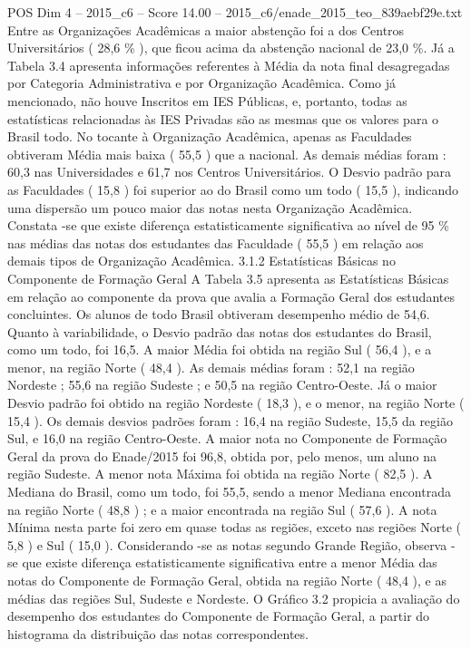 \begin{textsample}{POS Dim 4 – 2015\_c6 – Score 14.00 – 2015\_c6/enade\_2015\_teo\_839aebf29e.txt}
Entre as Organizações Acadêmicas a maior abstenção foi a dos Centros Universitários ( 28,6 \% ), que ficou acima da abstenção nacional de 23,0 \%.
Já a Tabela 3.4 apresenta informações referentes à Média da nota final desagregadas por Categoria Administrativa e por Organização Acadêmica.
Como já mencionado, não houve Inscritos em IES Públicas, e, portanto, todas as estatísticas relacionadas às IES Privadas são as mesmas que os valores para o Brasil todo.
No tocante à Organização Acadêmica, apenas as Faculdades obtiveram Média mais baixa ( 55,5 ) que a nacional.
As demais médias foram : 60,3 nas Universidades e 61,7 nos Centros Universitários.
O Desvio padrão para as Faculdades ( 15,8 ) foi superior ao do Brasil como um todo ( 15,5 ), indicando uma dispersão um pouco maior das notas nesta Organização Acadêmica.
Constata -se que existe diferença estatisticamente significativa ao nível de 95 \% nas médias das notas dos estudantes das Faculdade ( 55,5 ) em relação aos demais tipos de Organização Acadêmica. 3.1.2 Estatísticas Básicas no Componente de Formação Geral A Tabela 3.5 apresenta as Estatísticas Básicas em relação ao componente da prova que avalia a Formação Geral dos estudantes concluintes.
Os alunos de todo Brasil obtiveram desempenho médio de 54,6.
Quanto à variabilidade, o Desvio padrão das notas dos estudantes do Brasil, como um todo, foi 16,5.
A maior Média foi obtida na região Sul ( 56,4 ), e a menor, na região Norte ( 48,4 ).
As demais médias foram : 52,1 na região Nordeste ; 55,6 na região Sudeste ; e 50,5 na região Centro-Oeste.
Já o maior Desvio padrão foi obtido na região Nordeste ( 18,3 ), e o menor, na região Norte ( 15,4 ).
Os demais desvios padrões foram : 16,4 na região Sudeste, 15,5 da região Sul, e 16,0 na região Centro-Oeste.
A maior nota no Componente de Formação Geral da prova do Enade/2015 foi 96,8, obtida por, pelo menos, um aluno na região Sudeste.
A menor nota Máxima foi obtida na região Norte ( 82,5 ).
A Mediana do Brasil, como um todo, foi 55,5, sendo a menor Mediana encontrada na região Norte ( 48,8 ) ; e a maior encontrada na região Sul ( 57,6 ).
A nota Mínima nesta parte foi zero em quase todas as regiões, exceto nas regiões Norte ( 5,8 ) e Sul ( 15,0 ).
Considerando -se as notas segundo Grande Região, observa -se que existe diferença estatisticamente significativa entre a menor Média das notas do Componente de Formação Geral, obtida na região Norte ( 48,4 ), e as médias das regiões Sul, Sudeste e Nordeste.
O Gráfico 3.2 propicia a avaliação do desempenho dos estudantes do Componente de Formação Geral, a partir do histograma da distribuição das notas correspondentes.

\end{textsample}
